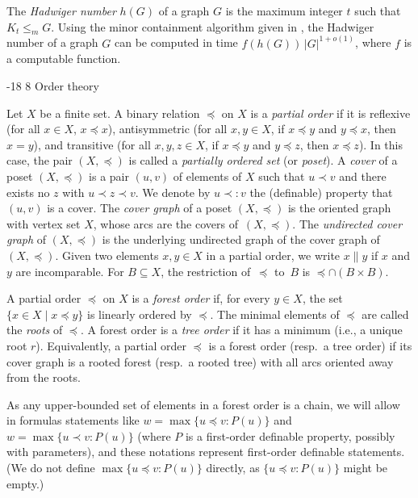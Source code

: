 \documentclass[1p,number,11pt]{elsarticle}
\makeatletter
\renewcommand\subsection{\@startsection{subsection}{2}{\z@}%
  {-18\p@ \@plus -4\p@ \@minus -4\p@}%
  {8\p@ \@plus 4\p@ \@minus 4\p@}%
  {\normalfont\normalsize\bfseries}}
\theoremstyle{plain}
\renewcommand{\leq}{\leqslant}
\newcommand{\pred}{\mathbin{\prec:}}
\makeatother
\begin{document}
The \emph{Hadwiger number} $h(G)$ of a graph $G$ is the maximum integer $t$ such that $K_t\leq_m G$.
Using the minor containment algorithm given in \cite{korhonen2024minor}, the Hadwiger number of a graph $G$ can be computed in time $f(h(G))\,|G|^{1+o(1)}$, where $f$ is a computable function.

\subsection{Order theory}

Let $X$ be a finite set.
A binary relation $\preceq$ on $X$ is a \emph{partial order} if it is reflexive
(for all $x\in X$, $x\preceq x$),
antisymmetric
(for all $x,y\in X$, if $x\preceq y$ and $y\preceq x$, then $x=y$),
and transitive
(for all $x,y,z\in X$, if $x\preceq y$ and $y\preceq z$, then $x\preceq z$).
In this case, the pair $(X,\preceq)$ is called a \emph{partially ordered set} (or \emph{poset}).
A \emph{cover} of a poset $(X,\preceq)$ is a pair $(u,v)$ of elements of $X$ such that $u\prec v$ and there exists no $z$ with $u\prec z\prec v$. We denote by $u\pred v$ the (definable) property that $(u,v)$ is a cover.
The \emph{cover graph} of a poset $(X,\preceq)$ is the oriented graph with vertex set $X$, whose arcs are the covers of~$(X,\preceq)$. The \emph{undirected cover graph} of $(X,\preceq)$ is the underlying undirected graph of the cover graph of~$(X,\preceq)$.
Given two elements $x,y\in X$ in a partial order, we write $x\parallel y$ if $x$ and $y$ are incomparable. 
For $B\subseteq X$, the restriction of~$\preceq$ to~$B$ is $\preceq\cap(B\times B)$. 

A partial order $\preceq$ on $X$ is a \emph{forest order} if, for every $y\in X$, the set
$
\{x\in X \mid x\preceq y\}$
is linearly ordered by $\preceq$.
The minimal elements of $\preceq$ are called the \emph{roots} of $\preceq$.
A forest order is a \emph{tree order} if it has a minimum (i.e., a unique root $r$).
Equivalently, a partial order $\preceq$ is a forest order (resp.\ a tree order) if its cover graph is a rooted forest (resp.\ a rooted tree) with all arcs oriented away from the roots.

As any upper-bounded set of elements in a forest order is a chain, we will allow
in formulas statements like 
$w=\max\{u\preceq v\colon P(u)\}$ and
$w=\max\{u\prec v\colon P(u)\}$ (where $P$ is a first-order definable property, possibly with parameters),  and these notations represent first-order definable statements. (We do not define $\max\{u\preceq v\colon P(u)\}$ directly, as 
$\{u\preceq v\colon P(u)\}$ might be empty.)
\end{document}
